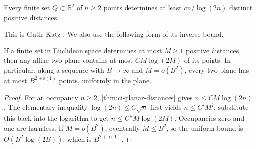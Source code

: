 \begin{theorem}\label{thm:ci-planar-distances}
Every finite set $Q\subset\mathbb{R}^2$ of $n\ge2$ points determines at least $c n/\log(2n)$ distinct positive distances.
\end{theorem}

This is Guth--Katz \cite[Theorem~1.1]{guthkatz2015}. We also use the following form of its inverse bound.

\begin{corollary}\label{cor:ci-planar-occupancy}
If a finite set in Euclidean space determines at most $M\ge1$ positive distances, then any affine two-plane contains at most $CM\log(2M)$ of its points.  In particular, along a sequence with $B\longrightarrow\infty$ and $M=o(B^2)$, every two-plane has at most $B^{2+o(1)}$ points, uniformly in the plane.
\end{corollary}

\begin{proof}
For an occupancy $n\ge2$, \cref{thm:ci-planar-distances} gives $n\le CM\log(2n)$.  The elementary inequality $\log(2n)\le C\sqrt n$ first yields $n\le C'M^2$; substitute this back into the logarithm to get $n\le C''M\log(2M)$. Occupancies zero and one are harmless.  If $M=o(B^2)$, eventually $M\le B^2$, so the uniform bound is $O(B^2\log(2B))$, which is $B^{2+o(1)}$.
\end{proof}
